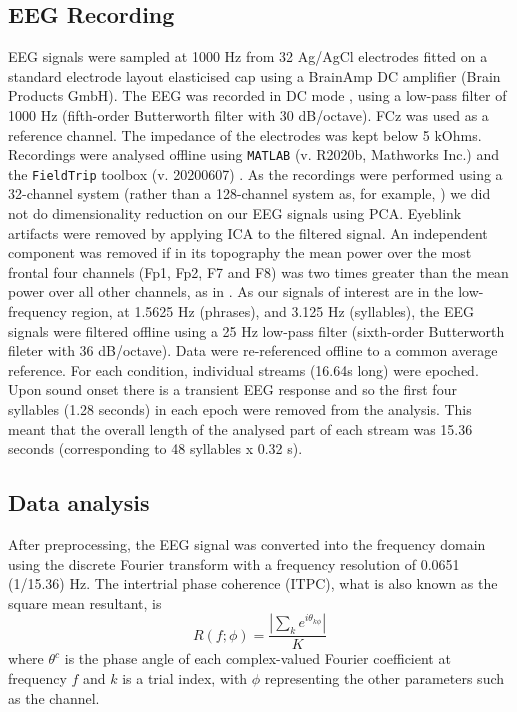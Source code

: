\documentclass[11pt,a4wide]{article}
\newcommand{\citet}[1]{\cite{#1}}
\begin{document}
\subsection*{EEG Recording}
 
EEG signals were sampled at 1000 Hz from 32 Ag/AgCl electrodes fitted
on a standard electrode layout elasticised cap using a BrainAmp DC
amplifier (Brain Products GmbH). The EEG was recorded in DC mode ,
using a low-pass filter of 1000 Hz (fifth-order Butterworth filter
with 30 dB/octave). FCz was used as a reference channel. The
impedance of the electrodes was kept below 5 kOhms. Recordings were
analysed offline using \texttt{MATLAB} (v. R2020b, Mathworks Inc.) and the
\texttt{FieldTrip} toolbox (v. 20200607) \cite{FieldTrip}. As the recordings were
performed using a 32-channel system (rather than a 128-channel system
as, for example, \citet{DingEtAl2017}) we did not do dimensionality
reduction on our EEG signals using PCA. Eyeblink artifacts were
removed by applying ICA to the filtered signal. An independent
component was removed if in its topography the mean power over the
most frontal four channels (Fp1, Fp2, F7 and F8) was two times greater
than the mean power over all other channels, as in
\citet{DingEtAl2017}. As our signals of interest are in the
low-frequency region, at 1.5625 Hz (phrases), and 3.125 Hz
(syllables), the EEG signals were filtered offline using a 25 Hz
low-pass filter (sixth-order Butterworth fileter with 36 dB/octave). Data were re-referenced
offline to a common average reference. For each condition, individual
streams (16.64s long) were epoched. Upon sound onset there is a
transient EEG response and so the first four syllables (1.28 seconds)
in each epoch were removed from the analysis. This meant that the
overall length of the analysed part of each stream was 15.36 seconds
(corresponding to 48 syllables x 0.32 s).

\subsection*{Data analysis}

After preprocessing, the EEG signal was converted into the frequency
domain using the discrete Fourier transform with a frequency
resolution of 0.0651 (1/15.36) Hz. The intertrial phase coherence
(ITPC), what is also known as the square mean resultant, is
\begin{equation}
\label{eq:itpc}
R(f;\phi)=\frac{\left|\sum_k e^{i\theta_{k\phi}}\right|}{K}
\end{equation}
where $\theta^c$ is the phase angle of each complex-valued Fourier
coefficient at frequency $f$ and $k$ is a trial index, with $\phi$
representing the other parameters such as the channel.
\end{document}
